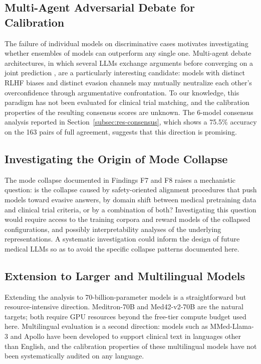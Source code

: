 \subsection{Multi-Agent Adversarial Debate for Calibration}
\label{subsec:conc-debate}

The failure of individual models on discriminative cases motivates 
investigating whether ensembles of models can outperform any single 
one. Multi-agent debate architectures, in which several LLMs exchange 
arguments before converging on a joint prediction 
\cite{ouyang2022training}, are a particularly interesting candidate: 
models with distinct RLHF biases and distinct evasion channels may 
mutually neutralize each other's overconfidence through argumentative 
confrontation. To our knowledge, this paradigm has not been evaluated 
for clinical trial matching, and the calibration properties of the 
resulting consensus scores are unknown. The 6-model consensus analysis 
reported in Section~\ref{subsec:res-consensus}, which shows a 75.5\% 
accuracy on the 163 pairs of full agreement, suggests that this 
direction is promising.

\subsection{Investigating the Origin of Mode Collapse}
\label{subsec:conc-collapse-origin}

The mode collapse documented in Findings F7 and F8 raises a 
mechanistic question: is the collapse caused by safety-oriented 
alignment procedures that push models toward evasive answers, by 
domain shift between medical pretraining data and clinical trial 
criteria, or by a combination of both? Investigating this question 
would require access to the training corpora and reward models of the 
collapsed configurations, and possibly interpretability analyses of 
the underlying representations. A systematic investigation could 
inform the design of future medical LLMs so as to avoid the specific 
collapse patterns documented here.

\subsection{Extension to Larger and Multilingual Models}
\label{subsec:conc-scale-future}

Extending the analysis to 70-billion-parameter models is a 
straightforward but resource-intensive direction. Meditron-70B and 
Med42-v2-70B are the natural targets; both require GPU resources 
beyond the free-tier compute budget used here. Multilingual evaluation 
is a second direction: models such as MMed-Llama-3 and Apollo have 
been developed to support clinical text in languages other than 
English, and the calibration properties of these multilingual models 
have not been systematically audited on any language.

